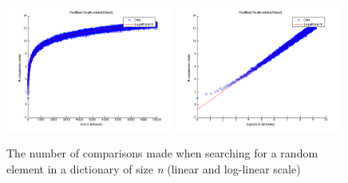 \begin{figure}[!htbp]
    \centering
    \includegraphics[width=0.49\textwidth]{resources/search}
    \includegraphics[width=0.49\textwidth]{resources/search_log}
    \caption{The number of comparisons made when searching for a random element in a dictionary of size \textit{n} (linear and log-linear scale)}
\end{figure}
